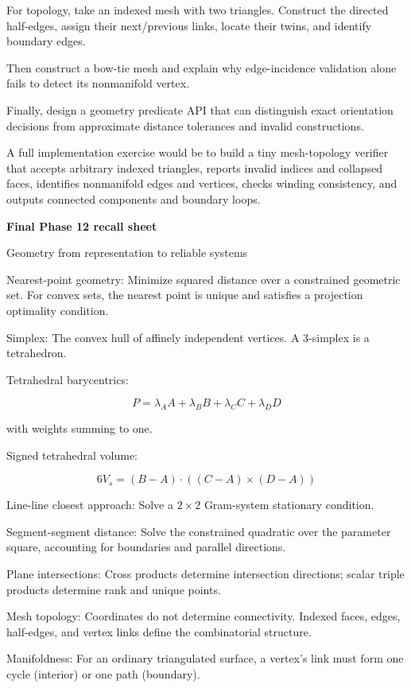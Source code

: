 For topology, take an indexed mesh with two triangles. Construct the directed half-edges, assign their next/previous links, locate their twins, and identify boundary edges.

Then construct a bow-tie mesh and explain why edge-incidence validation alone fails to detect its nonmanifold vertex.

Finally, design a geometry predicate API that can distinguish exact orientation decisions from approximate distance tolerances and invalid constructions.

A full implementation exercise would be to build a tiny mesh-topology verifier that accepts arbitrary indexed triangles, reports invalid indices and collapsed faces, identifies nonmanifold edges and vertices, checks winding consistency, and outputs connected components and boundary loops.

\textbf{Final Phase 12 recall sheet}

Geometry from representation to reliable systems

Nearest-point geometry: Minimize squared distance over a constrained geometric set. For convex sets, the nearest point is unique and satisfies a projection optimality condition.

Simplex: The convex hull of affinely independent vertices. A 3-simplex is a tetrahedron.

Tetrahedral barycentrics:

\[
P=\lambda_AA+\lambda_BB+\lambda_CC+\lambda_DD
\]

with weights summing to one.

Signed tetrahedral volume:

\[
6V_s=(B-A)\cdot((C-A)\times(D-A))
\]

Line-line closest approach: Solve a \(2\times2\) Gram-system stationary condition.

Segment-segment distance: Solve the constrained quadratic over the parameter square, accounting for boundaries and parallel directions.

Plane intersections: Cross products determine intersection directions; scalar triple products determine rank and unique points.

Mesh topology: Coordinates do not determine connectivity. Indexed faces, edges, half-edges, and vertex links define the combinatorial structure.

Manifoldness: For an ordinary triangulated surface, a vertex's link must form one cycle (interior) or one path (boundary).

